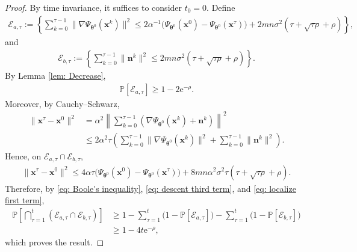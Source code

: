 \documentclass{siamart251216}
\begin{document}
\begin{proof}
    By time invariance, it suffices to consider $t_{0}=0$. Define
    \begin{gather*}
        \mathcal{E}_{a,\tau}:=\left\{\sum_{k=0}^{\tau-1}\|\nabla\Psi_{\boldsymbol{\theta}^{0}}(\mathbf{x}^{k})\|^{2}
        \leq2\alpha^{-1}\big(\Psi_{\boldsymbol{\theta}^{0}}(\mathbf{x}^{0})-\Psi_{\boldsymbol{\theta}^{0}}(\mathbf{x}^{\tau})\big)
        +2mn\sigma^{2}(\tau+\sqrt{\tau\rho}+\rho)\right\},
    \end{gather*}
    and
    \begin{gather*}
        \mathcal{E}_{b,\tau}:=\left\{\sum_{k=0}^{\tau-1}\|\mathbf{n}^{k}\|^{2}
        \leq2mn\sigma^{2}(\tau+\sqrt{\tau\rho}+\rho)\right\}.
    \end{gather*}
    By Lemma \ref{lem: Decrease},
    \begin{gather}
        \label{eq: localize first term}
        \mathbb{P}[\mathcal{E}_{a,\tau}]\geq1-2\mathrm{e}^{-\rho}.
    \end{gather}
    Moreover, by Cauchy--Schwarz,
    \begin{align}
        \label{eq: localize}
        \|\mathbf{x}^{\tau}-\mathbf{x}^{0}\|^{2}
        &=\alpha^{2}\left\|\sum_{k=0}^{\tau-1}\left(\nabla\Psi_{\boldsymbol{\theta}^{0}}(\mathbf{x}^{k})+\mathbf{n}^{k}\right)\right\|^{2}\nonumber\\
        &\leq2\alpha^{2}\tau\left(\sum_{k=0}^{\tau-1}\|\nabla\Psi_{\boldsymbol{\theta}^{0}}(\mathbf{x}^{k})\|^{2}
        +\sum_{k=0}^{\tau-1}\|\mathbf{n}^{k}\|^{2}\right).
    \end{align}
    Hence, on $\mathcal{E}_{a,\tau}\cap\mathcal{E}_{b,\tau}$,
    \begin{gather*}
        \|\mathbf{x}^{\tau}-\mathbf{x}^{0}\|^{2}
        \leq4\alpha\tau\big(\Psi_{\boldsymbol{\theta}^{0}}(\mathbf{x}^{0})-\Psi_{\boldsymbol{\theta}^{0}}(\mathbf{x}^{\tau})\big) +8mn\alpha^{2}\sigma^{2}\tau(\tau+\sqrt{\tau\rho}+\rho).
    \end{gather*}
    Therefore, by \eqref{eq: Boole's inequality}, \eqref{eq: descent third term}, and \eqref{eq: localize first term},
    \begin{align*}
        \mathbb{P}\left[\bigcap_{\tau=1}^{t}\left(\mathcal{E}_{a,\tau}\cap\mathcal{E}_{b,\tau}\right)\right]
        &\geq1-\sum_{\tau=1}^{t}\big(1-\mathbb{P}[\mathcal{E}_{a,\tau}]\big)
        -\sum_{\tau=1}^{t}\big(1-\mathbb{P}[\mathcal{E}_{b,\tau}]\big)\\
        &\geq1-4t\mathrm{e}^{-\rho},
    \end{align*}
    which proves the result.
\end{proof}
\end{document}
